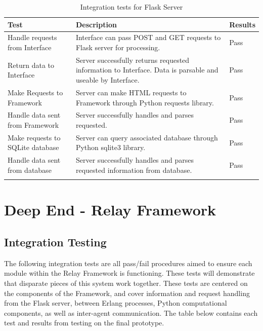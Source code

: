 \documentclass{report}
\begin{document}
\begin{longtable}[H] {| P{3.5cm} | P{10cm} | P{1.5cm} |}
    \hline
    Test                             & Description                                                                                                 & Results \\ \hline
    Handle requests from Interface   &  Interface can pass POST and GET requests to Flask server for processing.                                   & Pass    \\ \hline
    Return data to Interface         &  Server successfully returns requested information to Interface. Data is parsable and useable by Interface. & Pass    \\ \hline
    Make Requests to Framework       &  Server can make HTML requests to Framework through Python requests library.                                & Pass    \\ \hline
    Handle data sent from Framework  &  Server successfully handles and parses requested.                                                          & Pass    \\ \hline
    Make requests to SQLite database &  Server can query associated database through Python sqlite3 library.                                       & Pass    \\ \hline
    Handle data sent from database   &  Server successfully handles and parses requested information from database.                                &  Pass   \\ \hline
\caption{Integration tests for Flask Server}
\end{longtable}

\section{Deep End - Relay Framework}
\subsection{Integration Testing}
The following integration tests are all pass/fail procedures aimed to ensure each module within the Relay Framework is functioning. 
These tests will demonstrate that disparate pieces of this system work together. 
These tests are centered on the components of the Framework, and cover information and request handling from the Flask server, between Erlang processes, Python computational components, as well as inter-agent communication. 
The table below contains each test and results from testing on the final prototype.
\end{document}
